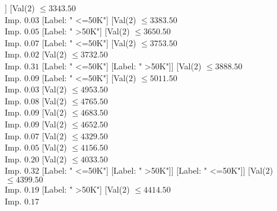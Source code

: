 \documentclass[margin=10pt]{standalone}
\begin{document}
\begin{forest}
																		[Label: " >50K"]
																		[Val($2$) $ \leq 2960.50$ \\ Imp. $0.04$
																			[Label: " <=50K"]
																			[Val($2$) $ \leq 3132.50$ \\ Imp. $0.04$
																				[Val($2$) $ \leq 3126.50$ \\ Imp. $0.17$
																					[Label: " <=50K"]
																					[Label: " >50K"]]
																				[Val($2$) $ \leq 3343.50$ \\ Imp. $0.03$
																					[Label: " <=50K"]
																					[Val($2$) $ \leq 3383.50$ \\ Imp. $0.05$
																						[Label: " >50K"]
																						[Val($2$) $ \leq 3650.50$ \\ Imp. $0.07$
																							[Label: " <=50K"]
																							[Val($2$) $ \leq 3753.50$ \\ Imp. $0.02$
																								[Val($2$) $ \leq 3732.50$ \\ Imp. $0.31$
																									[Label: " <=50K"]
																									[Label: " >50K"]]
																								[Val($2$) $ \leq 3888.50$ \\ Imp. $0.09$
																									[Label: " <=50K"]
																									[Val($2$) $ \leq 5011.50$ \\ Imp. $0.03$
																										[Val($2$) $ \leq 4953.50$ \\ Imp. $0.08$
																											[Val($2$) $ \leq 4765.50$ \\ Imp. $0.09$
																												[Val($2$) $ \leq 4683.50$ \\ Imp. $0.09$
																													[Val($2$) $ \leq 4652.50$ \\ Imp. $0.07$
																														[Val($2$) $ \leq 4329.50$ \\ Imp. $0.05$
																															[Val($2$) $ \leq 4156.50$ \\ Imp. $0.20$
																																[Val($2$) $ \leq 4033.50$ \\ Imp. $0.32$
																																	[Label: " <=50K"]
																																	[Label: " >50K"]]
																																[Label: " <=50K"]]
																															[Val($2$) $ \leq 4399.50$ \\ Imp. $0.19$
																																[Label: " >50K"]
																																[Val($2$) $ \leq 4414.50$ \\ Imp. $0.17$

\end{forest}
\end{document}
